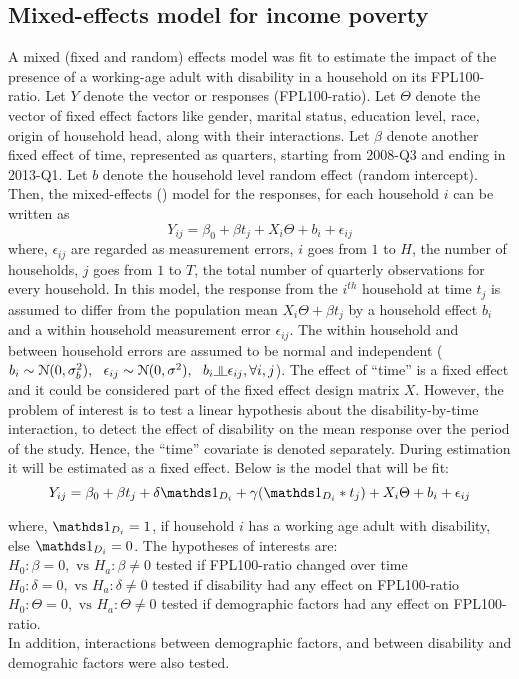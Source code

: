 \documentclass[11pt]{extarticle} %
\begin{document}
\subsection{Mixed-effects model for income poverty}
A mixed (fixed and random) effects model was fit to estimate the impact of the presence of a working-age adult with disability in a household on its FPL100-ratio. Let $Y$ denote the vector or responses (FPL100-ratio). Let $\Theta$ denote the vector of fixed effect factors like gender, marital status, education level, race, origin of household head, along with their interactions. Let $\beta$ denote another fixed effect of time, represented as quarters, starting from 2008-Q3 and ending in 2013-Q1. Let $b$ denote the household level random effect (random intercept). Then, the mixed-effects (\cite{Fitzmaurice_2012_Applied}) model for the responses, for each household $i$ can be written as
\vspace{-0.5cm}
\begin{equation}
Y_{ij} = \beta_0 + \beta t_j + X_i\Theta + b_i + \epsilon_{ij}
\label{eq:MixedEffects1}
\end{equation}
where, $\epsilon_{ij}$ are regarded as measurement errors, $i$ goes from $1$ to $H$, the number of households, $j$ goes from $1$ to $T$, the total number of quarterly observations for every household. In this model, the response from the $i^{th}$ household at time $t_j$ is assumed to differ from the population mean $X_i\Theta + \beta t_j$ by a household effect $b_i$ and a within household measurement error $\epsilon_{ij}$. The within household and between household errors are assumed to be normal and independent ($b_i \sim \N(0, \sigma^2_b),\ \ \epsilon_{ij} \sim \N(0, \sigma^2), \ \ b_i \indep \epsilon_{ij}, \forall i, j$). The effect of ``time'' is a fixed effect and it could be considered part of the fixed effect design matrix $X$. However, the problem of interest is to test a linear hypothesis about the disability-by-time interaction, to detect the effect of disability on the mean response over the period of the study. Hence, the ``time'' covariate is denoted separately. During estimation it will be estimated as a fixed effect. Below is the model that will be fit: 
\vspace{-0.5cm}
\begin{equation}
Y_{ij} = \beta_0 + \beta t_j + \delta \Ind_{D_i} + \gamma(\Ind_{D_i}*t_j) + X_i\Theta + b_i + \epsilon_{ij}
\label{eq:MixedEffects2}
\end{equation}

where, $\Ind_{D_i} = 1$, if household $i$ has a working age adult with disability, else $\Ind_{D_i} = 0$. The hypotheses of interests are: \\
$H_0: \beta = 0, \text{  vs  } H_a: \beta \ne 0$ tested if FPL100-ratio changed over time \\
$H_0: \delta = 0, \text{  vs  } H_a: \delta \ne 0$ tested if disability had any effect on FPL100-ratio\\
$H_0: \Theta = 0, \text{  vs  } H_a: \Theta \ne 0$ tested if demographic factors had any effect on FPL100-ratio. \\
In addition, interactions between demographic factors, and between disability and demograhic factors were also tested. 
\end{document}
